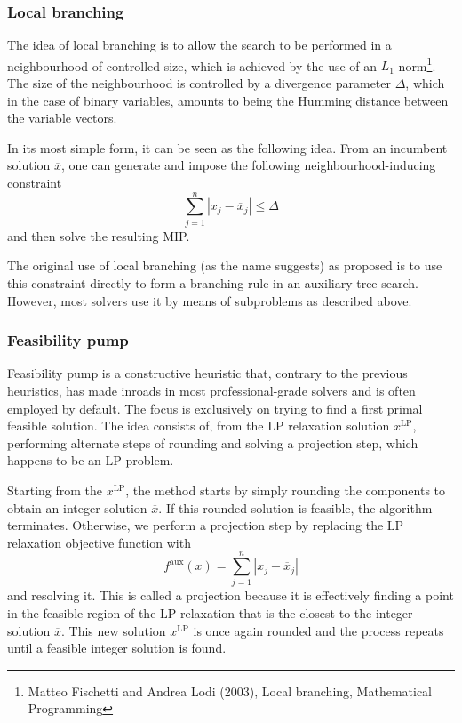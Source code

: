 
\subsubsection{Local branching}

The idea of local branching is to allow the search to be performed in a neighbourhood of controlled size, which is achieved by the use of an $L_1$-norm\footnote{Matteo Fischetti and Andrea Lodi (2003), Local branching, Mathematical Programming}. The size of the neighbourhood is controlled by a divergence parameter $\Delta$, which in the case of binary variables, amounts to being the Humming distance between the variable vectors. 

In its most simple form, it can be seen as the following idea. From an incumbent solution $\overline{x}$, one can generate and impose the following neighbourhood-inducing constraint
%
\begin{equation*}
	\sum_{j=1}^n | x_j - \overline{x}_j | \leq \Delta
\end{equation*}
%
and then solve the resulting MIP. 

The original use of local branching (as the name suggests) as proposed is to use this constraint directly to form a branching rule in an auxiliary tree search. However, most solvers use it by means of subproblems as described above.  


  
\subsubsection{Feasibility pump}

Feasibility pump is a constructive heuristic that, contrary to the previous heuristics, has made inroads in most professional-grade solvers and is often employed by default. The focus is exclusively on trying to find a first primal feasible solution. The idea consists of, from the LP relaxation solution $x^{\text{LP}}$, performing alternate steps of rounding and solving a projection step, which happens to be an LP problem.

Starting from the $x^{\text{LP}}$, the method starts by simply rounding the components to obtain an integer solution $\overline{x}$. If this rounded solution is feasible, the algorithm terminates. Otherwise, we perform a projection step by replacing the LP relaxation objective function with
	\begin{equation*}
		f^\text{aux}(x) = \sum_{j = 1}^n |x_j - \overline{x}_j|
	\end{equation*}
	and resolving it. This is called a projection because it is effectively finding a point in the feasible region of the LP relaxation that is the closest to the integer solution $\overline{x}$. This new solution $x^{\text{LP}}$ is once again rounded and the process repeats until a feasible integer solution is found.
	
